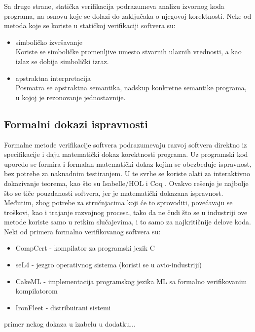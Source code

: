 \documentclass[a4paper]{article}
\begin{document}
Sa druge strane, statička verifikacija podrazumeva analizu izvornog koda programa, na osnovu koje se dolazi do zaključaka o njegovoj korektnosti.
Neke od metoda koje se koriste u statičkoj verifikaciji softvera su:
\begin{itemize}
\item simboličko izvršavanje \cite{symbolic_execution}\\
Koriste se simboličke promenljive umesto stvarnih ulaznih vrednosti, a kao izlaz se dobija simbolički izraz.
\item apstraktna interpretacija \cite{abstract_interpretation}\\
Posmatra se apstraktna semantika, nadskup konkretne semantike programa, u kojoj je rezonovanje jednostavnije.

\end{itemize}

\subsection{Formalni dokazi ispravnosti}
\label{subsec:formalni_dokazi}
Formalne metode verifikacije softvera podrazumevaju razvoj softvera direktno iz specifikacije i daju matematički dokaz korektnosti programa.
Uz programski kod uporedo se formira i formalan matematički dokaz kojim se obezbeđuje ispravnost, bez potrebe za naknadnim testiranjem.
U te svrhe se koriste alati za interaktivno dokazivanje teorema, kao što su Isabelle/HOL \cite{isabelle} i Coq \cite{coq}.
Ovakvo rešenje je najbolje što se tiče pouzdanosti softvera, jer je matematički dokazana ispravnost.
Međutim, zbog potrebe za stručnjacima koji će to sprovoditi, povećavaju se troškovi, kao i trajanje razvojnog procesa, tako da ne čudi što se u industriji ove metode koriste samo u retkim slučajevima, i to samo za najkritičnije delove koda.\\
Neki od primera formalno verifikovanog softvera su:
\begin{itemize}
\item CompCert - kompilator za programski jezik C \cite{compcert}
\item seL4 - jezgro operativnog sistema (koristi se u avio-industriji) \cite{sel4}
\item CakeML - implementacija programskog jezika ML sa formalno verifikovanim kompilatorom \cite{cakeml}
\item IronFleet - distribuirani sistemi \cite{ironfleet}
\end{itemize}

primer nekog dokaza u izabelu u dodatku...\\
\end{document}
